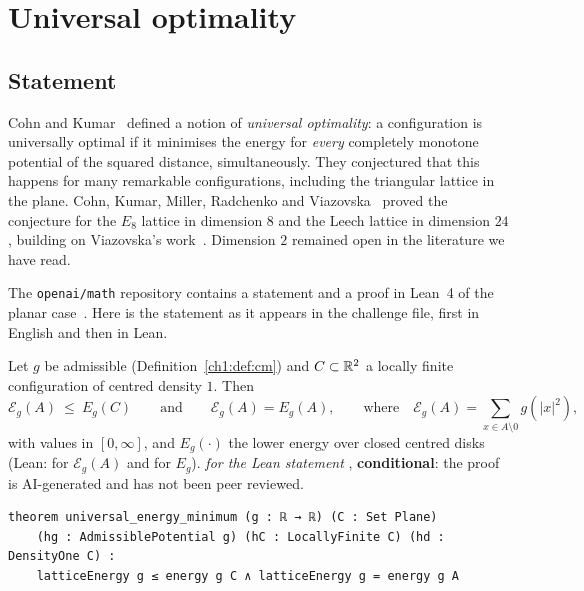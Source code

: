 \section{Universal optimality}
\label{ch1:sec:univ}

\subsection{Statement}

Cohn and Kumar~\cite{ck} defined a notion of \emph{universal optimality}: a configuration is universally optimal if it minimises the energy for
\emph{every} completely monotone potential of the squared distance, simultaneously. They conjectured that this happens for many remarkable
configurations, including the triangular lattice in the plane. Cohn, Kumar, Miller, Radchenko and Viazovska~\cite{ckmrv} proved the conjecture for the $E_8$ lattice in dimension $8$ and the Leech lattice
in dimension $24$ \tierL{}, building on Viazovska's work~\cite{viazovska}. Dimension $2$ remained open in the literature we have read.

The \texttt{openai/math} repository contains a statement and a proof in Lean~4 of the planar case~\cite{oai}. Here is the statement as it appears in the
challenge file, first in English and then in Lean.

\begin{theorem}\label{ch1:thm:univ}
Let $g$ be admissible (Definition~\ref{ch1:def:cm}) and $C\subset\mathbb{R}^2$ a locally finite configuration of centred density $1$. Then
\[
  \mathcal E_g(A)\ \le\ E_g(C)\qquad\text{and}\qquad \mathcal E_g(A)=E_g(A),\qquad\text{where}\quad \mathcal E_g(A)=\sum_{x\in A\setminus 0}g(|x|^2),
\]
with values in $[0,\infty]$, and $E_g(\cdot)$ the lower energy over closed centred disks (Lean:  for $\mathcal E_g(A)$ and  for $E_g$). \tierA{} \emph{for the Lean statement}
, \textbf{conditional}: the proof is AI-generated and has not been peer reviewed.
\end{theorem}

\begin{leanbox}
\begin{lstlisting}[language=Lean]
theorem universal_energy_minimum (g : ℝ → ℝ) (C : Set Plane)
    (hg : AdmissiblePotential g) (hC : LocallyFinite C) (hd : DensityOne C) :
    latticeEnergy g ≤ energy g C ∧ latticeEnergy g = energy g A
\end{lstlisting}
\end{leanbox}

